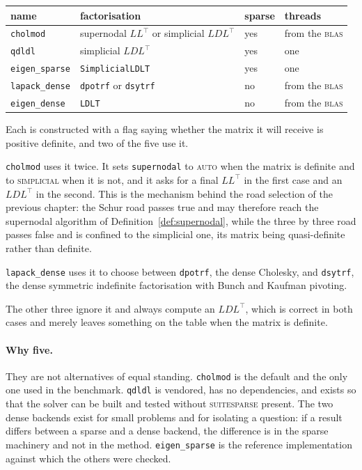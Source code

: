 \documentclass[a4paper,11pt]{book}
\theoremstyle{plain}
\theoremstyle{definition}
\theoremstyle{remark}
\numberwithin{equation}{chapter}
\numberwithin{algorithm}{chapter}
\begin{document}
	\begin{table}[H]
		\centering\small
		\begin{tabular}{llll}
			\toprule
			name & factorisation & sparse & threads\\
			\midrule
			\texttt{cholmod} & supernodal $LL^{\top}$ or simplicial $LDL^{\top}$
			& yes & from the \textsc{blas}\\
			\texttt{qdldl} & simplicial $LDL^{\top}$ & yes & one\\
			\texttt{eigen\_sparse} & \texttt{SimplicialLDLT} & yes & one\\
			\texttt{lapack\_dense} & \texttt{dpotrf} or \texttt{dsytrf} & no &
			from the \textsc{blas}\\
			\texttt{eigen\_dense} & \texttt{LDLT} & no & from the \textsc{blas}\\
			\bottomrule
		\end{tabular}
	\end{table}

	Each is constructed with a flag saying whether the matrix it will receive is
	positive definite, and two of the five use it.

	\texttt{cholmod} uses it twice. It sets \texttt{supernodal} to
	\textsc{auto} when the matrix is definite and to \textsc{simplicial} when it
	is not, and it asks for a final $LL^{\top}$ in the first case and an
	$LDL^{\top}$ in the second. This is the mechanism behind the road selection
	of the previous chapter: the Schur road passes true and may therefore reach
	the supernodal algorithm of Definition~\ref{def:supernodal}, while the three
	by three road passes false and is confined to the simplicial one, its matrix
	being quasi-definite rather than definite.

	\texttt{lapack\_dense} uses it to choose between \texttt{dpotrf}, the dense
	Cholesky, and \texttt{dsytrf}, the dense symmetric indefinite factorisation
	with Bunch and Kaufman pivoting.

	The other three ignore it and always compute an $LDL^{\top}$, which is
	correct in both cases and merely leaves something on the table when the
	matrix is definite.

	\paragraph{Why five.}
	They are not alternatives of equal standing. \texttt{cholmod} is the default
	and the only one used in the benchmark. \texttt{qdldl} is vendored, has no
	dependencies, and exists so that the solver can be built and tested without
	\textsc{suitesparse} present. The two dense backends exist for small problems
	and for isolating a question: if a result differs between a sparse and a
	dense backend, the difference is in the sparse machinery and not in the
	method. \texttt{eigen\_sparse} is the reference implementation against which
	the others were checked.
\end{document}
